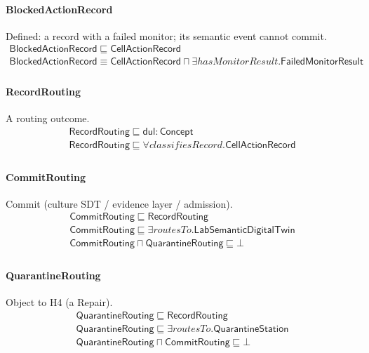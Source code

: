\documentclass[10pt]{article}
\begin{document}
\paragraph{BlockedActionRecord} Defined: a record with a failed monitor; its semantic event cannot commit.
\[\begin{array}{l}
\mathsf{BlockedActionRecord} \sqsubseteq  \mathsf{CellActionRecord} \\
\mathsf{BlockedActionRecord} \equiv  \mathsf{CellActionRecord} \sqcap  \exists \mathit{hasMonitorResult}.\mathsf{FailedMonitorResult} \\
\end{array}\]
\paragraph{RecordRouting} A routing outcome.
\[\begin{array}{l}
\mathsf{RecordRouting} \sqsubseteq  \mathsf{dul{:}Concept} \\
\mathsf{RecordRouting} \sqsubseteq  \forall \mathit{classifiesRecord}.\mathsf{CellActionRecord} \\
\end{array}\]
\paragraph{CommitRouting} Commit (culture SDT / evidence layer / admission).
\[\begin{array}{l}
\mathsf{CommitRouting} \sqsubseteq  \mathsf{RecordRouting} \\
\mathsf{CommitRouting} \sqsubseteq  \exists \mathit{routesTo}.\mathsf{LabSemanticDigitalTwin} \\
\mathsf{CommitRouting} \sqcap  \mathsf{QuarantineRouting} \sqsubseteq  \bot  \\
\end{array}\]
\paragraph{QuarantineRouting} Object to H4 (a Repair).
\[\begin{array}{l}
\mathsf{QuarantineRouting} \sqsubseteq  \mathsf{RecordRouting} \\
\mathsf{QuarantineRouting} \sqsubseteq  \exists \mathit{routesTo}.\mathsf{QuarantineStation} \\
\mathsf{QuarantineRouting} \sqcap  \mathsf{CommitRouting} \sqsubseteq  \bot  \\
\end{array}\]
\end{document}
